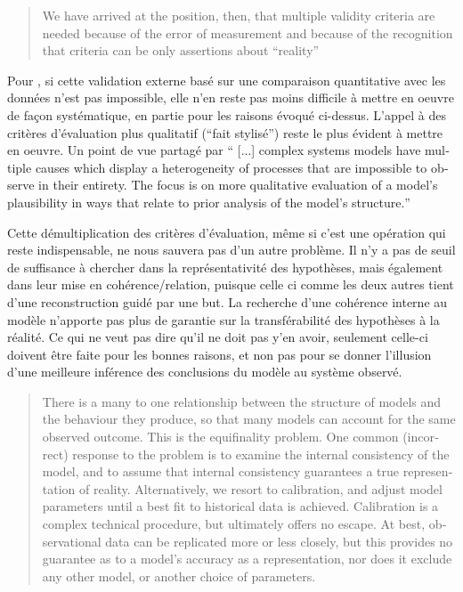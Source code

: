 \foreignblockquote{english}[\cite{Herman1967}]{We have arrived at the position, then, that multiple validity criteria are needed because of the error of measurement and because of the recognition that criteria can be only assertions about \enquote{reality}}

Pour \textcite{Amblard2006}, si cette validation externe basé sur une comparaison quantitative avec les données n'est pas impossible, elle n'en reste pas moins difficile à mettre en oeuvre de façon systématique, en partie pour les raisons évoqué ci-dessus. L'appel à des critères d'évaluation plus qualitatif (\enquote{fait stylisé}) reste le plus évident à mettre en oeuvre. Un point de vue partagé par \textcite{Batty2001} \foreignquote{english}{ [...] complex systems models have multiple causes which display a heterogeneity of processes that are impossible to observe in their entirety. The focus is on more qualitative evaluation of a model’s plausibility in ways that relate to prior analysis of the model’s structure.} 

Cette démultiplication des critères d'évaluation, même si c'est une opération qui reste indispensable, ne nous sauvera pas d'un autre problème. Il n'y a pas de seuil de suffisance à chercher dans la représentativité des hypothèses, mais également dans leur mise en cohérence/relation, puisque celle ci comme les deux autres tient d'une reconstruction guidé par une but. La recherche d'une cohérence interne au modèle n'apporte pas plus de garantie sur la transférabilité des hypothèses à la réalité. Ce qui ne veut pas dire qu'il ne doit pas y'en avoir, seulement celle-ci doivent être faite pour les bonnes raisons, et non pas pour se donner l'illusion d'une meilleure inférence des conclusions du modèle au système observé.

\foreignblockquote{english}[\cite{Osullivan2004}]{There is a many to one relationship between the structure of models and the behaviour they produce, so that many models can account for the same observed outcome. This is the equifinality problem. One common (incorrect) response to the problem is to examine the internal consistency of the model, and to assume that internal consistency guarantees a true representation of reality. Alternatively, we resort to calibration, and adjust model parameters until a best fit to historical data is achieved. Calibration is a complex technical procedure, but ultimately offers no escape. At best, observational data can be replicated more or less closely, but this provides no guarantee as to a model’s accuracy as a representation, nor does it exclude any other model, or another choice of parameters.}

